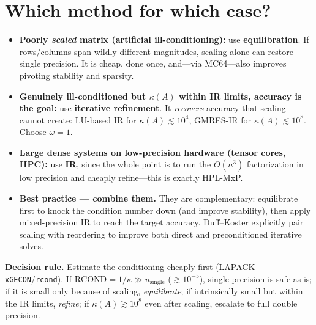 \documentclass[11pt]{article}
\begin{document}
\section{Which method for which case?}

\begin{itemize}\itemsep2pt
  \item \textbf{Poorly \emph{scaled} matrix (artificial ill-conditioning):} use
  \textbf{equilibration}. If rows/columns span wildly different magnitudes, scaling alone
  can restore single precision. It is cheap, done once, and---via MC64---also improves
  pivoting stability and sparsity.
  \item \textbf{Genuinely ill-conditioned but $\kappa(A)$ within IR limits, accuracy is the
  goal:} use \textbf{iterative refinement}. It \emph{recovers} accuracy that scaling cannot
  create: LU-based IR for $\kappa(A)\lesssim10^{4}$, GMRES-IR for $\kappa(A)\lesssim10^{8}$.
  Choose $\omega=1$.
  \item \textbf{Large dense systems on low-precision hardware (tensor cores, HPC):} use
  \textbf{IR}, since the whole point is to run the $O(n^3)$ factorization in low precision
  and cheaply refine---this is exactly HPL-MxP.
  \item \textbf{Best practice --- combine them.} They are complementary: equilibrate first
  to knock the condition number down (and improve stability), then apply mixed-precision IR
  to reach the target accuracy. Duff--Koster explicitly pair scaling with reordering to
  improve both direct and preconditioned iterative solves.
\end{itemize}

\noindent\textbf{Decision rule.} Estimate the conditioning cheaply first (LAPACK
\texttt{xGECON}/\texttt{rcond}). If $\mathrm{RCOND}=1/\kappa \gg u_{\text{single}}$
($\gtrsim10^{-5}$), single precision is safe as is; if it is small only because of scaling,
\emph{equilibrate}; if intrinsically small but within the IR limits, \emph{refine}; if
$\kappa(A)\gtrsim10^{8}$ even after scaling, escalate to full double precision.
\end{document}
